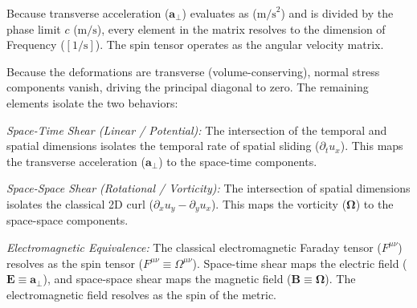 Because transverse acceleration ($\mathbf{a}_\perp$) evaluates as ($\text{m/s}^2$) and is divided by the phase limit $c$ ($\text{m/s}$), every element in the matrix resolves to the dimension of Frequency ($[1/\text{s}]$). The spin tensor operates as the angular velocity matrix. 

Because the deformations are transverse (volume-conserving), normal stress components vanish, driving the principal diagonal to zero. The remaining elements isolate the two behaviors: 

\textit{Space-Time Shear (Linear / Potential):} The intersection of the temporal and spatial dimensions isolates the temporal rate of spatial sliding ($\partial_t u_x$). This maps the transverse acceleration ($\mathbf{a}_\perp$) to the space-time components. 

\textit{Space-Space Shear (Rotational / Vorticity):} The intersection of spatial dimensions isolates the classical 2D curl ($\partial_x u_y - \partial_y u_x$). This maps the vorticity ($\boldsymbol{\Omega}$) to the space-space components. 

\textit{Electromagnetic Equivalence:} The classical electromagnetic Faraday tensor ($F^{\mu\nu}$) resolves as the spin tensor ($F^{\mu\nu} \equiv \Omega^{\mu\nu}$). Space-time shear maps the electric field ($\mathbf{E} \equiv \mathbf{a}_\perp$), and space-space shear maps the magnetic field ($\mathbf{B} \equiv \boldsymbol{\Omega}$). The electromagnetic field resolves as the spin of the metric.

